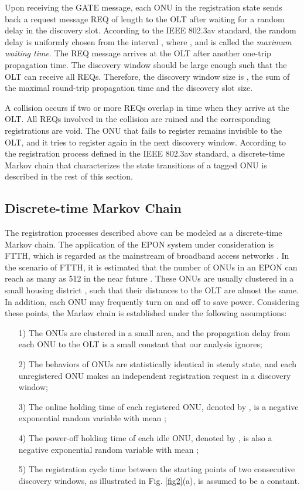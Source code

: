 \documentclass[journal]{IEEEtran}
\begin{document}
Upon receiving the GATE message, each ONU in the registration state sends back a request message REQ of length  \cite{1kramer2005,9cui2012throughput,10Bjelica,11Bhatia} to the OLT after waiting for a random delay in the discovery slot. According to the IEEE 802.3av standard, the random delay is uniformly chosen from the interval , where , and is called the \emph{maximum waiting time}\cite{11Bhatia}. The REQ message arrives at the OLT after another one-trip propagation time. The discovery window should be large enough such that the OLT can receive all REQs. Therefore, the discovery window size is , the sum of the maximal round-trip propagation time and the discovery slot size.

A collision occurs if two or more REQs overlap in time when they arrive at the OLT. All REQs involved in the collision are ruined and the corresponding registrations are void. The ONU that fails to register remains invisible to the OLT, and it tries to register again in the next discovery window. According to the registration process defined in the IEEE 802.3av standard, a discrete-time Markov chain that characterizes the state transitions of a tagged ONU is described in the rest of this section.

\subsection{Discrete-time Markov Chain}\label{subsection2B}
The registration processes described above can be modeled as a discrete-time Markov chain. The application of the EPON system under consideration is FTTH, which is regarded as the mainstream of broadband access networks \cite{1kramer2005,15Hutcheson}. In the scenario of FTTH, it is estimated that the number of ONUs in an EPON can reach as many as 512 in the near future \cite{7chan2010remote,8hajduczenia2010ieee}. These ONUs are usually clustered in a small housing district \cite{16Vaughn}, such that their distances to the OLT are almost the same. In addition, each ONU may frequently turn on and off to save power. Considering these points, the Markov chain is established under the following assumptions:
\begin{itemize}
  \item [1)] The ONUs are clustered in a small area, and the propagation delay from each ONU to the OLT is a small constant that our analysis ignores;
  \item [2)] The behaviors of ONUs are statistically identical in steady state, and each unregistered ONU makes an independent registration request in a discovery window;
  \item [3)] The online holding time of each registered ONU, denoted by , is a negative exponential random variable with mean ;
  \item [4)] The power-off holding time of each idle ONU, denoted by , is also a negative exponential random variable with mean ;
  \item [5)] The registration cycle time  between the starting points of two consecutive discovery windows, as illustrated in Fig. \ref{fig2}(a), is assumed to be a constant.
\end{itemize}
\end{document}
